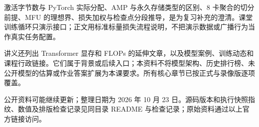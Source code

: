 \documentclass[UTF8,fontset=fandol,zihao=-4,a4paper]{ctexart}
\begin{document}
激活字节数与 PyTorch 实际分配、AMP 与永久存储类型的区别、8 卡聚合的切分前提、MFU 的理想界、损失加权与检查点分段推导，是为复习补充的澄清。课堂训练循环只演示接口；正文用标准标量损失流程说明，不把演示数据或广播行为当作真实任务配置。

讲义还列出 Transformer 显存和 FLOPs 的延伸文章，以及模型案例、训练动态和课程行政链接。它们属于背景或后续入口；本资料不将模型架构、历史排行榜、未公开模型的估算或作业答案扩展为本课要求。所有核心章节已按正式与录像版逐项覆盖。

公开资料可能继续更新；整理日期为 2026 年 10 月 23 日。源码版本和执行快照指纹、数值及排版检查记录见同目录 README 与检查记录；原始资料通过以上官方链接访问。
\normalsize
\end{document}
